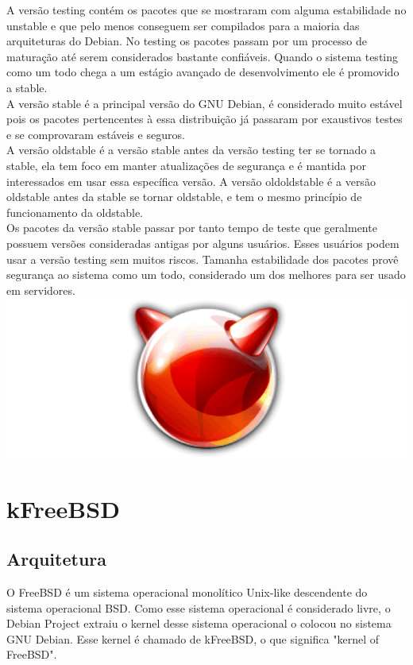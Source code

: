 \documentclass[conference]{IEEEtran}
\begin{document}
A versão testing contém os pacotes que se mostraram com alguma estabilidade no unstable e que pelo menos conseguem ser compilados para a maioria das arquiteturas do Debian. No testing os pacotes passam por um processo de maturação até serem considerados bastante confiáveis. Quando o sistema testing como um todo chega a um estágio avançado de desenvolvimento ele é promovido a stable.\\

A versão stable é a principal versão do GNU Debian, é considerado muito estável pois os pacotes pertencentes à essa distribuição já passaram por exaustivos testes e se comprovaram estáveis e seguros.\\

A versão oldstable é a versão stable antes da versão testing ter se tornado a stable, ela tem foco em manter atualizações de segurança e é mantida por interessados em usar essa específica versão. A versão oldoldstable é a versão oldstable antes da stable se tornar oldstable, e tem o mesmo princípio de funcionamento da oldstable.\\

Os pacotes da versão stable passar por tanto tempo de teste que geralmente possuem versões consideradas antigas por alguns usuários. Esses usuários podem usar a versão testing sem muitos riscos. Tamanha estabilidade dos pacotes provê segurança ao sistema como um todo, considerado um dos melhores para ser usado em servidores\cite{DebianVersions}.\\

\includegraphics[scale = 0.2]{FreeBSD.png}\\
\section{kFreeBSD}\label{sec:BSD}
\subsection{Arquitetura}\label{sec:BSDArq}
O FreeBSD é um sistema operacional monolítico Unix-like descendente do sistema operacional BSD. Como esse sistema operacional é considerado livre, o Debian Project extraiu o kernel desse sistema operacional o colocou no sistema GNU Debian. Esse kernel é chamado de kFreeBSD, o que significa "kernel of FreeBSD".\cite{Debian-kFreeBSD-wiki}
\end{document}
